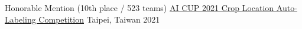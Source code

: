 
\begin{cvhonors}

  \cvhonor
    {Honorable Mention (10th place / 523 teams)} %
    {\href{https://www.aicup.tw/_files/ugd/7fbdbf_b443104b5b754b1ab7ce707bfe772713.pdf}{AI CUP 2021 Crop Location Auto-Labeling Competition}} %
    {Taipei, Taiwan} %
    {2021} %

\end{cvhonors}
